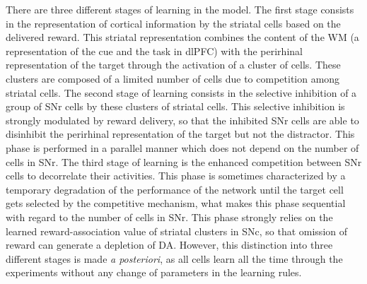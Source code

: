 \documentclass[
  11pt,
  a4paper,
]{scrbook}
\begin{document}
There are three different stages of learning in the model. The first
stage consists in the representation of cortical information by the
striatal cells based on the delivered reward. This striatal
representation combines the content of the WM (a representation of the
cue and the task in dlPFC) with the perirhinal representation of the
target through the activation of a cluster of cells. These clusters are
composed of a limited number of cells due to competition among striatal
cells. The second stage of learning consists in the selective inhibition
of a group of SNr cells by these clusters of striatal cells. This
selective inhibition is strongly modulated by reward delivery, so that
the inhibited SNr cells are able to disinhibit the perirhinal
representation of the target but not the distractor. This phase is
performed in a parallel manner which does not depend on the number of
cells in SNr. The third stage of learning is the enhanced competition
between SNr cells to decorrelate their activities. This phase is
sometimes characterized by a temporary degradation of the performance of
the network until the target cell gets selected by the competitive
mechanism, what makes this phase sequential with regard to the number of
cells in SNr. This phase strongly relies on the learned
reward-association value of striatal clusters in SNc, so that omission
of reward can generate a depletion of DA. However, this distinction into
three different stages is made \emph{a posteriori}, as all cells learn
all the time through the experiments without any change of parameters in
the learning rules.
\end{document}
